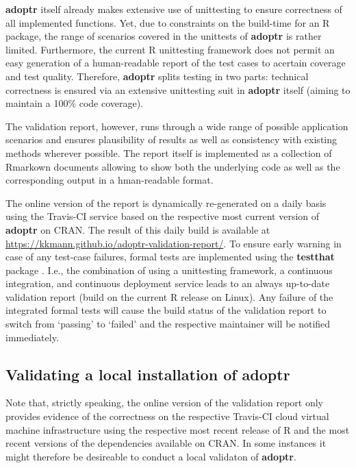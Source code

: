 \documentclass[]{book}
\begin{document}
\textbf{adoptr} itself already makes extensive use of unittesting to
ensure correctness of all implemented functions.
Yet, due to constraints on the build-time for an R package,
the range of scenarios covered in the unittests of \textbf{adoptr} is
rather limited.
Furthermore, the current R unittesting framework does not permit
an easy generation of a human-readable report of the test cases
to acertain coverage and test quality.
Therefore, \textbf{adoptr} splits testing in two parts: technical
correctness is ensured via an extensive unittesting suit in \textbf{adoptr}
itself (aiming to maintain a 100\% code coverage).

The validation report, however, runs through a wide range of possible
application scenarios and ensures plausibility of results as well
as consistency with existing methods wherever possible.
The report itself is implemented as a collection of Rmarkown documents
allowing to show both the underlying code as well as the corresponding
output in a hman-readable format.

The online version of the report is dynamically re-generated on a
daily basis using the Travis-CI service based on the respective
most current version of \textbf{adoptr} on CRAN.
The result of this daily build is available at \url{https://kkmann.github.io/adoptr-validation-report/}.
To ensure early warning in case of any test-case failures,
formal tests are implemented using the \textbf{testthat} package
\citep{R-testthat}.
I.e., the combination of using a unittesting framework, a continuous
integration, and continuous deployment service leads to an always
up-to-date validation report (build on the current R release on Linux).
Any failure of the integrated formal tests will cause the build status
of the validation report to switch from `passing' to `failed' and
the respective maintainer will be notified immediately.

\hypertarget{validating-a-local-installation-of-adoptr}{%
\subsection{Validating a local installation of adoptr}\label{validating-a-local-installation-of-adoptr}}

Note that, strictly speaking, the online version of the validation
report only provides evidence of the correctness on the respective
Travis-CI cloud virtual machine infrastructure using the respective
most recent release of R and the most recent versions of the
dependencies available on CRAN.
In some instances it might therefore be desireable to conduct a
local validaton of \textbf{adoptr}.
\end{document}
